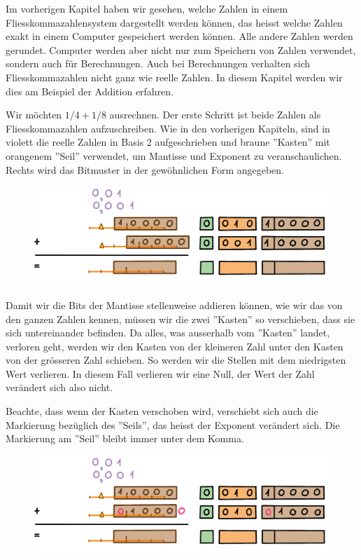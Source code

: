 Im vorherigen Kapitel haben wir gesehen, welche Zahlen in einem Fliesskommazahlensystem dargestellt werden können, das heisst welche Zahlen  exakt in einem Computer gespeichert werden können. Alle andere Zahlen werden gerundet. Computer werden aber nicht nur zum Speichern von Zahlen verwendet, sondern auch für Berechnungen.  Auch bei Berechnungen verhalten sich Fliesskommazahlen nicht ganz wie reelle Zahlen. In diesem Kapitel werden wir dies am Beispiel der Addition erfahren. 

\begin{beispiel}
Wir möchten \(1/4 + 1/8\) ausrechnen. Der erste Schritt ist beide Zahlen als Fliesskommazahlen aufzuschreiben. Wie in den vorherigen Kapiteln, sind in violett die reelle Zahlen in Basis 2 aufgeschrieben und braune ''Kasten'' mit orangenem ''Seil'' verwendet, um Mantisse und Exponent zu veranschaulichen. Rechts wird das Bitmuster in der gewöhnlichen Form angegeben.
\begin{figure}[H]
\centering
\includegraphics[width=\linewidth]{Pictures/Addition1-4and1-8_1.png}
\end{figure}

Damit wir die Bits der Mantisse stellenweise addieren können, wie wir das von den ganzen Zahlen kennen, müssen wir die zwei ''Kasten'' so verschieben, dass sie sich untereinander befinden. Da alles, was ausserhalb vom ''Kasten'' landet, verloren geht, werden wir den Kasten von der kleineren Zahl unter den Kasten von der grösseren Zahl schieben. So werden wir die Stellen mit dem niedrigsten Wert verlieren. In diesem Fall verlieren wir eine Null, der Wert der Zahl verändert sich also nicht.

Beachte, dass wenn der Kasten verschoben wird, verschiebt sich auch die Markierung bezüglich des ''Seils'', das heisst der Exponent verändert sich. Die Markierung am ''Seil'' bleibt immer unter dem Komma.
\begin{figure}[H]
\centering
\includegraphics[width=\linewidth]{Pictures/Addition1-4and1-8_2.png}
\end{figure}


\end{beispiel}
